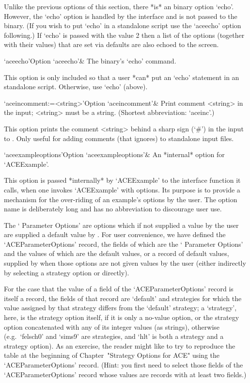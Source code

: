 Unlike the previous options of this  section,  there  *is*  an  {\ACE}
binary option `echo'. However, the `echo' option  is  handled  by  the
{\ACE} interface and is not passed to the {\ACE} binary. (If you  wish
to put  `echo'  in  a  standalone  script  use  the  `aceecho'  option
following.) If `echo' is passed with the value 2 then a  list  of  the
options (together with their values) that are set via {\ACE}  defaults
are also echoed to the screen.

\>`aceecho'{Option `aceecho'}& 
The {\ACE} binary's `echo' command.

This option is only included so  that  a  user  *can*  put  an  `echo'
statement in  an  {\ACE}  standalone  script.  Otherwise,  use  `echo'
(above).

\>`aceincomment:=<string>'{Option `aceincomment'}&
Print comment <string> in the {\ACE} input; <string> must be a string.
(Shortest abbreviation: `aceinc'.)

This option prints the comment <string> behind a sharp sign (`\#')  in
the input to {\ACE}. Only useful  for  adding  comments  (that  {\ACE}
ignores) to standalone input files.

\>`aceexampleoptions'{Option `aceexampleoptions'}&
An *internal* option for `ACEExample'.

This option is passed  *internally*  by  `ACEExample'  to  the  {\ACE}
interface function  it  calls,  when  one  invokes  `ACEExample'  with
options. Its purpose is to provide a mechanism for the over-riding  of
an example's options by the user. The option name is deliberately long
and has no abbreviation to discourage user use.

\enditems


The \lq{}{\ACE} Parameter Options' are options which if not supplied a
value by the user are supplied a default value  by  {\ACE}.  For  user
convenience, we  have  defined  the  `ACEParameterOptions'{\undoquotes
{}}   record,   the
fields of which are the \lq{}{\ACE} Parameter Options' and the  values
of which are the default  values,  or  a  record  of  default  values,
supplied by {\ACE} when those options are not given values by the user
(either indirectly by selecting a strategy option  or  directly). 

For the case that the value of a field  of  the  `ACEParameterOptions'
record is itself a record, the fields of that record are `default' and
strategies for which the value assigned by that strategy differs  from
the `default' strategy; a \lq{}strategy', here, is the strategy option
itself, if it is only  a  no-value  option,  or  the  strategy  option
concatenated with any of its integer values  (as  strings),  otherwise
(e.g.~`felsch0' and `sims9'  are  strategies,  and  `hlt'  is  both  a
strategy and a strategy option). As an exercise, the reader might like
to try to reproduce the table at the  beginning  of  Chapter~"Strategy
Options for ACE" using the `ACEParameterOptions'  record.  (Hint:  you
first need to select those fields of the `ACEParameterOptions'  record
whose values are records with at least two fields.)

